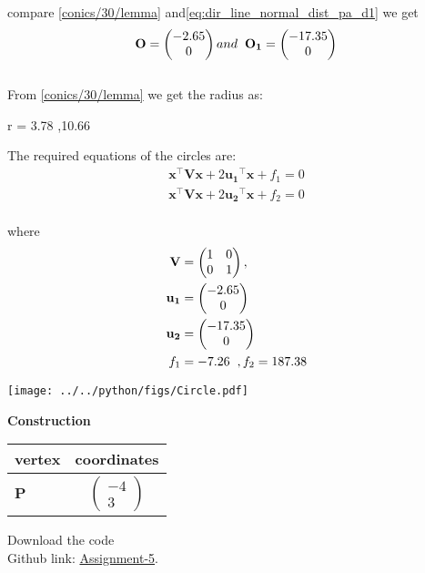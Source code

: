 \documentclass[10pt,a4paper]{report}
\newcommand{\myvec}[1]{\ensuremath{\begin{pmatrix}#1\end{pmatrix}}}
\let\vec\mathbf
\let\vec\mathbf
\begin{document}
\begin{multicols}{2}
 
compare \eqref{conics/30/lemma} and\eqref{eq:dir_line_normal_dist_pa_d1} we get\\
\begin{align}
\vec{O}=\myvec{-2.65\\
0} and\hspace{2mm} \vec{O_1}=\myvec{-17.35\\
0}
\end{align}\\
From \eqref{conics/30/lemma} we get the radius as:\\
\begin{center}
r = 3.78 ,10.66
\end{center}
\vspace{1mm}
The required equations of the circles are:\\
\begin{align}
    \label{eq:conic_quad_form1}
    \vec{x}^{\top}\vec{V}\vec{x}+2\vec{u_1}^{\top}\vec{x}+f_1=0\\
     \vec{x}^{\top}\vec{V}\vec{x}+2\vec{u_2}^{\top}\vec{x}+f_2=0
    \end{align}\\
    where\\
    \begin{align}
	\label{eq:V_matrix}
	\vec{V} &= \myvec{1 & 0\\0 & 1},
	\\
	\label{eq:u_vector}
	\vec{u_1} &= \myvec{-2.65\\0}\\
	\vec{u_2} &= \myvec{-17.35\\0}
	\\
	\label{eq:fvalue}
	f_1 &= -7.26 \hspace{2mm}, f_2=187.38
\end{align}
\begin{center}
\texttt{[image: ../../python/figs/Circle.pdf]}   
 \end{center}\vspace{1mm}
 
 \vspace{2mm} \textbf{Construction}
\begin{center}
\setlength{\arrayrulewidth}{0.5mm}
\setlength{\tabcolsep}{6pt}
\renewcommand{\arraystretch}{1.5}
    \begin{tabular}{|l|c|}
    \hline 
    \textbf{vertex} & \textbf{coordinates} \\ \hline
   $\vec{P}$ & $\myvec{
   -4\\
   3
   } $ \\\hline
      \end{tabular}
  \end{center}
  
\raggedright  Download the code \\
Github link: \href{https://github.com/KrishnaYadati/Assignments/blob/main/Matrix_circle_assignment/codes/circle.py}{Assignment-5}.
  \end{multicols}
\end{document}
